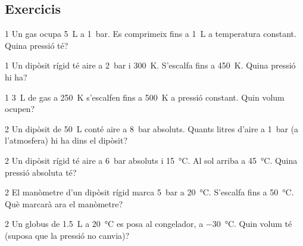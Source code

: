 \subsection*{Exercicis}

\begin{exercici}{1}
Un gas ocupa \SI{5}{\liter} a \SI{1}{\bar}. Es comprimeix fins a \SI{1}{\liter} a temperatura constant. Quina pressió té?
\end{exercici}

\begin{exercici}{1}
Un dipòsit rígid té aire a \SI{2}{\bar} i \SI{300}{\kelvin}. S'escalfa fins a \SI{450}{\kelvin}. Quina pressió hi ha?
\end{exercici}

\begin{exercici}{1}
\SI{3}{\liter} de gas a \SI{250}{\kelvin} s'escalfen fins a \SI{500}{\kelvin} a pressió constant. Quin volum ocupen?
\end{exercici}

\begin{exercici}{2}
Un dipòsit de \SI{50}{\liter} conté aire a \SI{8}{\bar} absoluts. Quants litres d'aire a \SI{1}{\bar} (a l'atmosfera) hi ha dins el dipòsit?
\end{exercici}

\begin{exercici}{2}
Un dipòsit rígid té aire a \SI{6}{\bar} absoluts i \SI{15}{\degreeCelsius}. Al sol arriba a \SI{45}{\degreeCelsius}. Quina pressió absoluta té?
\end{exercici}

\begin{exercici}{2}
El manòmetre d'un dipòsit rígid marca \SI{5}{\bar} a \SI{20}{\degreeCelsius}. S'escalfa fins a \SI{50}{\degreeCelsius}. Què marcarà ara el manòmetre?
\end{exercici}

\begin{exercici}{2}
Un globus de \SI{1,5}{\liter} a \SI{20}{\degreeCelsius} es posa al congelador, a \SI{-30}{\degreeCelsius}. Quin volum té (suposa que la pressió no canvia)?
\end{exercici}

